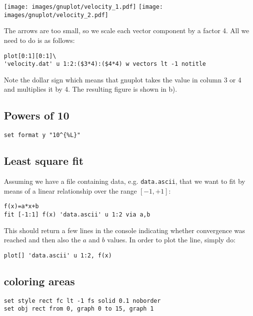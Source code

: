\begin{center}
\texttt{[image: images/gnuplot/velocity\_1.pdf]}
\texttt{[image: images/gnuplot/velocity\_2.pdf]}
\end{center}

The arrows are too small, so we scale each vector component by a factor 4.
All we need to do is as follows:

\begin{verbatim}
plot[0:1][0:1]\
'velocity.dat' u 1:2:($3*4):($4*4) w vectors lt -1 notitle
\end{verbatim}

Note the dollar sign which 
means that gnuplot takes the value in column 3 or 4 and multiplies it by 4.
The resulting figure is shown in b).

\subsection*{Powers of 10}

\begin{verbatim}
set format y "10^{%L}"
\end{verbatim}


\subsection*{Least square fit}

Assuming we have a file containing data, e.g. {\tt data.ascii}, that 
we want to fit by means of a linear relationship over the range $[-1,+1]$:
\begin{verbatim}
f(x)=a*x+b 
fit [-1:1] f(x) 'data.ascii' u 1:2 via a,b
\end{verbatim}
This should return a few lines in the console indicating whether 
convergence was reached and then also the $a$ and $b$ values. 
In order to plot the line, simply do:
\begin{verbatim}
plot[] 'data.ascii' u 1:2, f(x)
\end{verbatim}


\subsection*{coloring areas}


\begin{verbatim}
set style rect fc lt -1 fs solid 0.1 noborder
set obj rect from 0, graph 0 to 15, graph 1
\end{verbatim}


